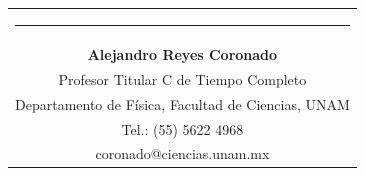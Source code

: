 \documentclass[11pt,letterpaper]{article}
\begin{document}
	{\vspace{-2.85cm}\hspace{7cm}\begin{tabular} { c}
			\setlength{\tabcolsep}{15pt}
			\renewcommand{\arraystretch}{1}
			\noindent\rule{5.5cm}{0.4pt}\qquad \\
			
			\qquad  \textbf{Alejandro Reyes Coronado} \qquad \\
			\qquad Profesor Titular C de Tiempo Completo  \qquad \\  
			\qquad Departamento de Física, Facultad de Ciencias, UNAM\qquad \\ 
			\qquad  Tel.: (55) 5622 4968 \qquad \\
			\qquad coronado@ciencias.unam.mx \qquad \\
			
		\end{tabular}
		
	}
	
	
	
	
	
	
	
	
	
	
	
	
	
	
	
	
	
	
	
	
	
	
	
	
	
	
	
	\printbibliography
	
\end{document}
